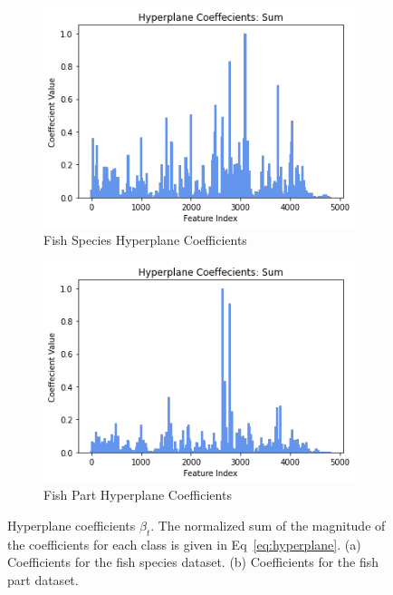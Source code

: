 \documentclass{article}
\begin{document}
\begin{figure}[htb]
  \centering
  \begin{subfigure}[b]{\linewidth}
    \includegraphics[width=1\linewidth]{fish_total_coefficients.png}
    \caption{Fish Species Hyperplane Coefficients}
    \label{fig:fish-hyperplane-coeffcients}
  \end{subfigure}

  \begin{subfigure}[b]{\linewidth}
    \includegraphics[width=1\linewidth]{part_total_coefficients.png}
    \caption{Fish Part Hyperplane Coefficients}
    \label{fig:part-hyperplane-coeffcients}
  \end{subfigure}

  \caption[Two numerical solutions]{
    Hyperplane coefficients $\beta_t$.
    The normalized sum of the magnitude of the coefficients for each class is given in Eq~\ref{eq:hyperplane}.
    (a) Coefficients for the fish species dataset.
    (b) Coefficients for the fish part dataset.}
  \label{fig:hyperplane-coefficients}
\end{figure}
\end{document}
